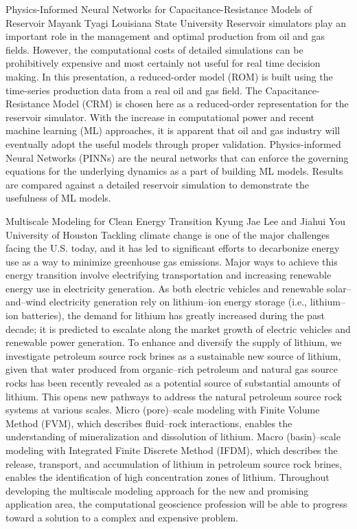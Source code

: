 \begin{addmargin}[2em]{0em}
\vspace{1.5ex}
\abs
{Physics-Informed Neural Networks for Capacitance-Resistance Models of Reservoir}
{Mayank Tyagi}
{Louisiana State University}
{Reservoir simulators play an important role in the management and optimal production from oil and gas fields. However, the computational costs of detailed simulations can be prohibitively expensive and most certainly not useful for real time decision making. In this presentation, a reduced-order model (ROM) is built using the time-series production data from a real oil and gas field. The Capacitance-Resistance Model (CRM) is chosen here as a reduced-order representation for the reservoir simulator. With the increase in computational power and recent machine learning (ML) approaches, it is apparent that oil and gas industry will eventually adopt the useful models through proper validation. Physics-informed Neural Networks (PINNs) are the neural networks that can enforce the governing equations for the underlying dynamics as a part of building ML models. Results are compared against a detailed reservoir simulation to demonstrate the usefulness of ML models.}

\vspace{1.5ex}
\abs
{Multiscale Modeling for Clean Energy Transition}
{Kyung Jae Lee and Jiahui You}
{University of Houston}
{Tackling climate change is one of the major challenges facing the U.S. today, and it has led to significant efforts to decarbonize energy use as a way to minimize greenhouse gas emissions. Major ways to achieve this energy transition involve electrifying transportation and increasing renewable energy use in electricity generation. As both electric vehicles and renewable solar–and–wind electricity generation rely on lithium–ion energy storage (i.e., lithium–ion batteries), the demand for lithium has greatly increased during the past decade; it is predicted to escalate along the market growth of electric vehicles and renewable power generation. To enhance and diversify the supply of lithium, we investigate petroleum source rock brines as a sustainable new source of lithium, given that water produced from organic–rich petroleum and natural gas source rocks has been recently revealed as a potential source of substantial amounts of lithium. This opens new pathways to address the natural petroleum source rock systems at various scales. Micro (pore)–scale modeling with Finite Volume Method (FVM), which describes fluid–rock interactions, enables the understanding of mineralization and dissolution of lithium. Macro (basin)–scale modeling with Integrated Finite Discrete Method (IFDM), which describes the release, transport, and accumulation of lithium in petroleum source rock brines, enables the identification of high concentration zones of lithium. Throughout developing the multiscale modeling approach for the new and promising application area, the computational geoscience profession will be able to progress toward a solution to a complex and expensive problem.}


\end{addmargin}

